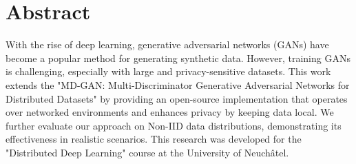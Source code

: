 \chapter{Abstract}
With the rise of deep learning, generative adversarial networks (GANs) have become a popular method for generating synthetic data. However, training GANs is challenging, especially with large and privacy-sensitive datasets. This work extends the "MD-GAN: Multi-Discriminator Generative Adversarial Networks for Distributed Datasets" \cite{mdgan} by providing an open-source implementation that operates over networked environments and enhances privacy by keeping data local. We further evaluate our approach on Non-IID data distributions, demonstrating its effectiveness in realistic scenarios. This research was developed for the "Distributed Deep Learning" course at the University of Neuchâtel.